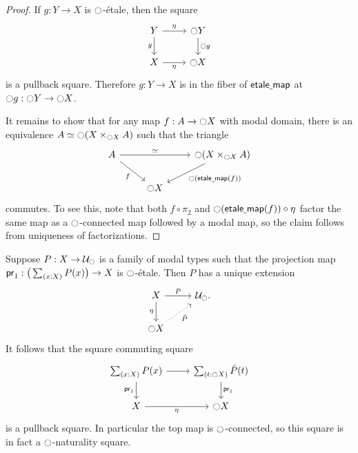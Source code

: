 \begin{proof}
If $g:Y\to X$ is ${\ocircle}$-\'etale, then the square
\begin{equation*}
\begin{tikzcd}
Y \arrow[d,swap,"g"] \arrow[r,"\modalunit"] & \modal Y \arrow[d,"\modal g"] \\
X \arrow[r,swap,"\modalunit"] & \modal X
\end{tikzcd}
\end{equation*}
is a pullback square. Therefore $g:Y\to X$ is in the fiber of $\mathsf{etale\underline{\ }{}map}$ at ${\ocircle} g : {\ocircle} Y\to{\ensuremath{\ocircle}} X$. 

It remains to show that for any map $f:A\to{\ensuremath{\ocircle}} X$ with modal domain, there is an equivalence $\eqv{A}{\modal (X\times_{\modal X} A)}$ such that the triangle
\begin{equation*}
\begin{tikzcd}
A \arrow[dr,swap,"f"] \arrow[rr,"\eqvsym"] & & \modal (X\times_{\modal X} A) \arrow[dl,"\modal(\etmap(f))"] \\
& \modal X
\end{tikzcd}
\end{equation*}
commutes. To see this, note that both $f\circ \pi_2$ and ${\ocircle}(\mathsf{etale\underline{\ }{}map}(f))\circ {\eta_{}}$ factor the same map as a ${\ocircle}$-connected map followed by a modal map, so the claim follows from uniqueness of factorizations.
\end{proof}

\begin{cor}
Suppose $P:X\to\mathcal{U}_{\ocircle}$ is a family of modal types such that the projection map $\proj 1:\big(\sm{x:X}P(x)\big)\to X$ is ${\ocircle}$-\'etale. Then $P$ has a unique extension
\begin{equation*}
\begin{tikzcd}
X \arrow[d,swap,"\modalunit"] \arrow[r,"P"] & \UU_\modal. \\
\modal X \arrow[ur,densely dotted,swap,"\tilde{P}"] 
\end{tikzcd}
\end{equation*}
It follows that the square commuting square
\begin{equation*}
\begin{tikzcd}
\sm{x:X}P(x) \arrow[d,swap,"\proj 1"] \arrow[r] & \sm{t:\modal X}\tilde{P}(t) \arrow[d,"\proj 1"] \\
X \arrow[r,swap,"\modalunit"] & \modal X
\end{tikzcd}
\end{equation*}
is a pullback square. In particular the top map is ${\ocircle}$-connected, so this square is in fact a ${\ocircle}$-naturality square.
\end{cor}

